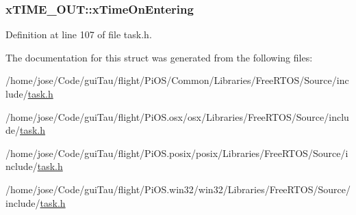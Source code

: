 \hypertarget{structx_t_i_m_e___o_u_t_a8342bf2057b33c50205da6a19d9caa1c}{
\subsubsection[{x\-Time\-On\-Entering}]{ x\-T\-I\-M\-E\-\_\-\-O\-U\-T\-::x\-Time\-On\-Entering}}\label{structx_t_i_m_e___o_u_t_a8342bf2057b33c50205da6a19d9caa1c}


Definition at line 107 of file task.\-h.



The documentation for this struct was generated from the following files\-:\begin{DoxyCompactItemize}
\item 
/home/jose/\-Code/gui\-Tau/flight/\-Pi\-O\-S/\-Common/\-Libraries/\-Free\-R\-T\-O\-S/\-Source/include/\hyperlink{_common_2_libraries_2_free_r_t_o_s_2_source_2include_2task_8h}{task.\-h}\item 
/home/jose/\-Code/gui\-Tau/flight/\-Pi\-O\-S.\-osx/osx/\-Libraries/\-Free\-R\-T\-O\-S/\-Source/include/\hyperlink{osx_2osx_2_libraries_2_free_r_t_o_s_2_source_2include_2task_8h}{task.\-h}\item 
/home/jose/\-Code/gui\-Tau/flight/\-Pi\-O\-S.\-posix/posix/\-Libraries/\-Free\-R\-T\-O\-S/\-Source/include/\hyperlink{posix_2posix_2_libraries_2_free_r_t_o_s_2_source_2include_2task_8h}{task.\-h}\item 
/home/jose/\-Code/gui\-Tau/flight/\-Pi\-O\-S.\-win32/win32/\-Libraries/\-Free\-R\-T\-O\-S/\-Source/include/\hyperlink{win32_2win32_2_libraries_2_free_r_t_o_s_2_source_2include_2task_8h}{task.\-h}\end{DoxyCompactItemize}
